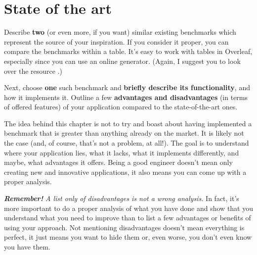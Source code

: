 \chapter{State of the art}

Describe \textbf{two} (or even more, if you want) similar existing benchmarks which represent the source of your inspiration. If you consider it proper, you can compare the benchmarks within a table. It's easy to work with tables in Overleaf, especially since you can use an online generator. (Again, I suggest you to look over the resource \cite{table-generator}.) 

Next, choose \textbf{one} such benchmark and \textbf{briefly describe its functionality}, and how it implements it. Outline a few \textbf{advantages and disadvantages} (in terms of offered features) of your application compared to the state-of-the-art ones. 

The idea behind this chapter is not to try and boast about having implemented a benchmark that is greater than anything already on the market. It is likely not the case (and, of course, that's not a problem, at all!). The goal is to understand where your application lies, what it lacks, what it implements differently, and maybe, what advantages it offers. Being a good engineer doesn't mean only creating new and innovative applications, it also means you can come up with a proper analysis. 

\textit{\textbf{Remember!} A list only of disadvantages is not a wrong analysis.} In fact, it's more important to do a proper analysis of what you have done and show that you understand what you need to improve than to list a few advantages or benefits of using your approach. Not mentioning disadvantages doesn't mean everything is perfect, it just means you want to hide them or, even worse, you don't even know you have them. 
